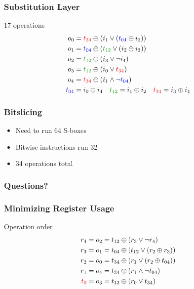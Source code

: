 \documentclass[17pt]{beamer}
\newcommand{\xor}[0]{\oplus}
\newcommand{\red}[1]{\textcolor[rgb]{0.9,0.0,0.0}{#1}}
\newcommand{\blu}[1]{\textcolor[rgb]{0.0,0.0,0.9}{#1}}
\newcommand{\grn}[1]{\textcolor[rgb]{0.0,0.6,0.0}{#1}}
\begin{document}
\newcommand{\tde}[0]{\red{t_{34}}}
\newcommand{\tae}[0]{\blu{t_{04}}}
\newcommand{\tbc}[0]{\grn{t_{12}}}

\begin{frame}[t]
    \frametitle{Substitution Layer}
    17 operations
    \begin{align*}
        o_0 & = \tde \xor (i_1 \vee (\tae \xor i_2)) \\
        o_1 & = \tae \xor (\tbc \vee (i_2 \xor i_3)) \\
        o_2 & = \tbc \xor (i_3 \vee \neg i_4) \\
        o_3 & = \tbc \xor (i_0 \vee \tde) \\
        o_4 & = \tde \xor (i_1 \wedge \neg \tae) \\
        \tae & = i_0 \xor i_4 \quad
        \tbc = i_1 \xor i_2 \quad
        \tde = i_3 \xor i_4 \\
    \end{align*}
\end{frame}

\begin{frame}
    \frametitle{Bitslicing}
    \begin{itemize}
        \item Need to run 64 S-boxes
        \item Bitwise instructions run 32
        \item 34 operations total
    \end{itemize}
\end{frame}

\begin{frame}
    \frametitle{Questions?}
\end{frame}

\begin{frame}[t]
    \frametitle{Minimizing Register Usage}
    Operation order
    \begin{align*}
        r_4 & = o_2 = t_{12} \xor (r_3 \vee \neg r_4) \\
        r_3 & = o_1 = t_{04} \xor (t_{12} \vee (r_2 \xor r_3)) \\
        r_2 & = o_0 = t_{34} \xor (r_1 \vee (r_2 \xor t_{04})) \\
        r_1 & = o_4 = t_{34} \xor (r_1 \wedge \neg t_{04}) \\
        \red{t_0} & = o_3 = t_{12} \xor (r_0 \vee t_{34}) \\
    \end{align*}
\end{frame}
\end{document}
